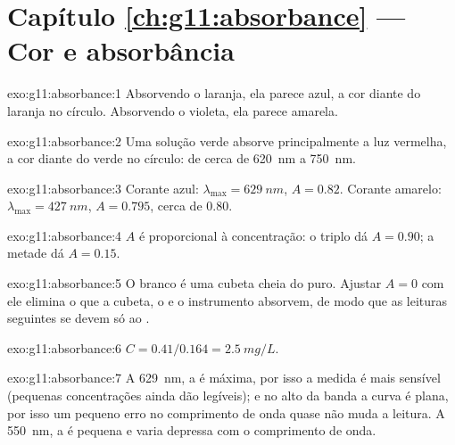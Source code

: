 \section*{Capítulo \ref{ch:g11:absorbance} --- Cor e absorbância}

\begin{solution}{exo:g11:absorbance:1}
Absorvendo o laranja, ela parece azul, a cor diante do laranja no
círculo. Absorvendo o violeta, ela parece amarela.
\end{solution}

\begin{solution}{exo:g11:absorbance:2}
Uma solução verde absorve principalmente a luz vermelha, a cor diante do
verde no círculo: de cerca de \qty{620}{nm} a \qty{750}{nm}.
\end{solution}

\begin{solution}{exo:g11:absorbance:3}
Corante azul: $\lambda_{\max} = \qty{629}{nm}$, $A = 0.82$. Corante
amarelo: $\lambda_{\max} = \qty{427}{nm}$, $A = 0.795$, cerca de 0.80.
\end{solution}

\begin{solution}{exo:g11:absorbance:4}
$A$ é proporcional à concentração: o triplo dá $A = 0.90$; a metade dá
$A = 0.15$.
\end{solution}

\begin{solution}{exo:g11:absorbance:5}
O branco é uma cubeta cheia do  puro. Ajustar $A = 0$ com ele
elimina o que a cubeta, o  e o instrumento absorvem, de modo que
as leituras seguintes se devem só ao .
\end{solution}

\begin{solution}{exo:g11:absorbance:6}
$C = 0.41 / 0.164 = \qty{2.5}{mg/L}$.
\end{solution}

\begin{solution}{exo:g11:absorbance:7}
A \qty{629}{nm}, a  é máxima, por isso a medida é mais
sensível (pequenas concentrações ainda dão  legíveis); e no
alto da banda a curva é plana, por isso um pequeno erro no comprimento
de onda quase não muda a leitura. A \qty{550}{nm}, a  é
pequena e varia depressa com o comprimento de onda.
\end{solution}

